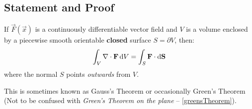 \documentclass[../main.tex]{subfiles}
\begin{document}
\subsection{Statement and Proof}
\begin{theorem}
  If $\vec{F}(\vec{x})$ is a continuously differentiable vector field and $V$ is a volume enclosed by a piecewise smooth orientable \textbf{closed} surface $S = \partial V$, then:
  \label{divergenceTheorem}
  \[
    \int_{V} \nabla \cdot \vec{F} \d{V} = \int_{S} \vec{F} \cdot \d{\vec{S}}
  \]
  where the normal $S$ points \textit{outwards} from $V$.
\end{theorem}
\begin{remark}[Nomenclature]
  This is sometimes known as Gauss's Theorem or occasionally Green's Theorem (Not to be confused with \textit{Green's Theorem on the plane} -- \cref{greensTheorem}).
\end{remark}
\end{document}
